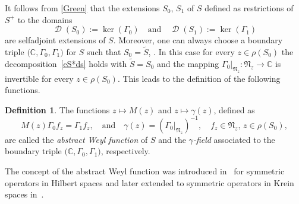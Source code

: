 \documentclass{article}
\numberwithin{equation}{section}
\theoremstyle{definition}
\newtheorem{definition}[theorem]{Definition}
\newcommand{\wt}[1]{\widetilde{#1}}
\newcommand{\N}{\mathbb{N}}
\newcommand{\mD}{\mathcal{D}}
\newcommand{\define}[1]{\textit{#1}}
\newcommand{\DiffInt}{\Aj_0}  %
\newcommand{\Aj}[1][j]{A^{(#1)}}  %
\newcommand{\eigf}[1]{u_{#1}}  %
\DeclareMathOperator{\dom}{\mD}
\begin{document}
It follows from \eqref{Green} that the extensions $S_0$, $S_1$ of $S$ defined as restrictions of $S^+$ to the domains
\begin{equation*}
	\dom(S_0) :=  \ker(\Gamma_0)\quad \mbox{and} \quad \dom(S_1) :=\ker(\Gamma_1)
\end{equation*}
are selfadjoint extensions of $S$. Moreover, one can always choose  a boundary triple $\bigl(\mathbb{C},\Gamma_0,\Gamma_1\bigr)$ for $S$ such that $S_0=\wt S$, \cite[Proposition~2.2]{D99}. In this case  for every $z\in\rho(S_0)$ the decomposition~\eqref{eS*ds} holds with $\wt{S} = S_0$ and the mapping $\Gamma_0|_{\mathfrak{N}_z}:\mathfrak{N}_z\to\mathbb{C}$ is invertible for every $z\in\rho(S_0)$. 
This leads to the definition of the following functions.

\begin{definition}
\label{W00A}
The  functions $z\mapsto M(z)$ and $z\mapsto \gamma(z)$, defined as 
\begin{equation*} 
    M(z)\Gamma_0f_{z}=\Gamma_1f_{z}, \quad\text{and} \quad \gamma(z)=\left(\Gamma_0|_{\mathfrak{N}_z}\right)^{-1}, \quad f_z\in\mathfrak{N}_z,\,z\in\rho(S_0),
\end{equation*}
are called the \define{abstract Weyl function} of $S$ and the \define{$\gamma$-field} associated to the boundary triple $\bigl(\mathbb{C},\Gamma_0,\Gamma_1\bigr)$, respectively.
\end{definition}
The concept of the abstract Weyl function was introduced in~\cite{DM91} for symmetric operators in Hilbert spaces and later extended to symmetric operators in Krein spaces in~\cite{D95}.

\end{document}
